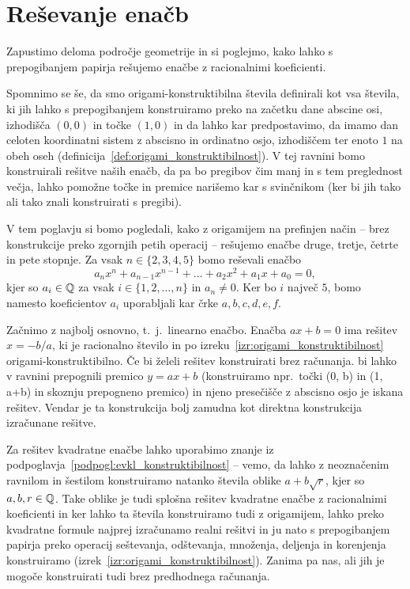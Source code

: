 \section{Reševanje enačb}
\label{pogl:enacbe}



Zapustimo deloma področje geometrije in si poglejmo, kako lahko s prepogibanjem papirja rešujemo enačbe z racionalnimi koeficienti.

Spomnimo se še, da smo origami-konstruktibilna števila definirali kot vsa števila, ki jih lahko s prepogibanjem konstruiramo preko na začetku dane abscine osi, izhodišča $(0,0)$ in točke $(1,0)$ in da lahko kar predpostavimo, da imamo dan celoten koordinatni sistem z abscisno in ordinatno osjo, izhodiščem ter enoto $1$ na obeh oseh (definicija~\ref{def:origami_konstruktibilnost}). V tej ravnini bomo konstruirali rešitve naših enačb, da pa bo pregibov čim manj in s tem preglednost večja, lahko pomožne točke in premice narišemo kar s svinčnikom (ker bi jih tako ali tako znali konstruirati s pregibi).

V tem poglavju si bomo pogledali, kako z origamijem na prefinjen način -- brez konstrukcije preko zgornjih petih operacij -- rešujemo enačbe druge, tretje, četrte in pete stopnje. Za vsak $n \in \{2, 3, 4, 5\}$ bomo reševali enačbo
$$ a_n x^n + a_{n-1} x^{n-1} + \ldots + a_2 x^2 + a_1 x + a_0 = 0, $$
kjer so $a_i \in \mathbb Q$ za vsak $i \in \{1, 2, \ldots, n\}$ in $a_n \neq 0$. Ker bo $i$ največ $5$, bomo namesto koeficientov $a_i$ uporabljali kar črke $a, b, c, d, e, f$.

Začnimo z najbolj osnovno, t.\ j.\ linearno enačbo. Enačba $ax + b = 0$ ima rešitev $x = -b/a$, ki je racionalno število in po izreku~\ref{izr:origami_konstruktibilnost} origami-konstruktibilno. Če bi želeli rešitev konstruirati brez računanja. bi lahko v ravnini prepognili premico $y = ax + b$ (konstruiramo npr.\ točki (0, b) in (1, a+b) in skoznju prepogneno premico) in njeno presečišče z abscisno osjo je iskana rešitev. Vendar je ta konstrukcija bolj zamudna kot direktna konstrukcija izračunane rešitve.

Za rešitev kvadratne enačbe lahko uporabimo znanje iz podpoglavja~\ref{podpogl:evkl_konstruktibilnost} -- vemo, da lahko z neoznačenim ravnilom in šestilom konstruiramo natanko števila oblike $a + b\sqrt{r}$, kjer so $a, b, r \in \mathbb Q$. Take oblike je tudi splošna rešitev kvadratne enačbe z racionalnimi koeficienti in ker lahko ta števila konstruiramo tudi z origamijem, lahko preko kvadratne formule najprej izračunamo realni rešitvi in ju nato s prepogibanjem papirja preko operacij seštevanja, odštevanja, množenja, deljenja in korenjenja konstruiramo (izrek~\ref{izr:origami_konstruktibilnost}). Zanima pa nas, ali jih je mogoče konstruirati tudi brez predhodnega računanja.

